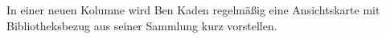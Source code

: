 In einer neuen Kolumne wird Ben Kaden regelmäßig eine Ansichtskarte mit
Bibliotheksbezug aus seiner Sammlung kurz vorstellen.
